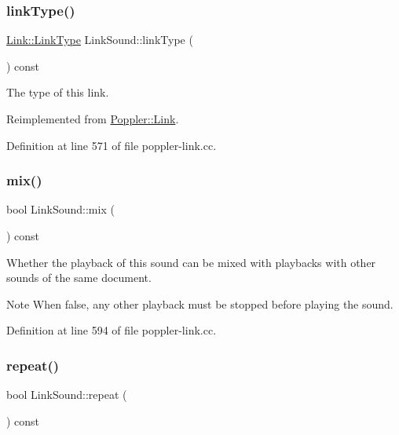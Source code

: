 \subsubsection{\texorpdfstring{link\+Type()}{linkType()}}
{\footnotesize\ttfamily \hyperlink{class_poppler_1_1_link_af0dacfa77a548bb043dbae4bb9dc6c1e}{Link\+::\+Link\+Type} Link\+Sound\+::link\+Type (\begin{DoxyParamCaption}{ }\end{DoxyParamCaption}) const\hspace{0.3cm}{\ttfamily [virtual]}}

The type of this link. 

Reimplemented from \hyperlink{class_poppler_1_1_link_a3e3ad7e8867e255c24b9a562bad596ed}{Poppler\+::\+Link}.



Definition at line 571 of file poppler-\/link.\+cc.

\mbox{\label{class_poppler_1_1_link_sound_a3220c1ae670fe98c97de88224aa30447}} 
\subsubsection{\texorpdfstring{mix()}{mix()}}
{\footnotesize\ttfamily bool Link\+Sound\+::mix (\begin{DoxyParamCaption}{ }\end{DoxyParamCaption}) const}

Whether the playback of this sound can be mixed with playbacks with other sounds of the same document.

\begin{DoxyNote}{Note}
When false, any other playback must be stopped before playing the sound. 
\end{DoxyNote}


Definition at line 594 of file poppler-\/link.\+cc.

\mbox{\label{class_poppler_1_1_link_sound_a1169c94ef7d988a1fbe4bd84b0a2a9d2}} 
\subsubsection{\texorpdfstring{repeat()}{repeat()}}
{\footnotesize\ttfamily bool Link\+Sound\+::repeat (\begin{DoxyParamCaption}{ }\end{DoxyParamCaption}) const}

